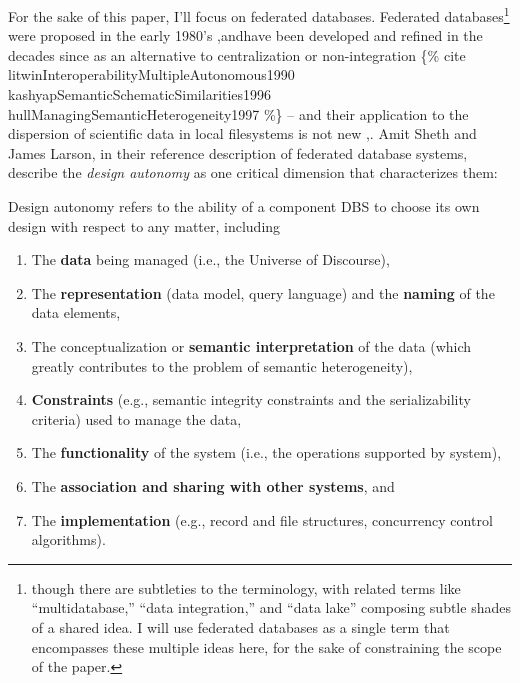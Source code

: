 \documentclass{article}
\begin{document}
For the sake of this paper, I'll focus on federated databases. Federated
databases\footnote{though there are subtleties to the terminology, with
  related terms like ``multidatabase,'' ``data integration,'' and ``data
  lake'' composing subtle shades of a shared idea. I will use federated
  databases as a single term that encompasses these multiple ideas here,
  for the sake of constraining the scope of the paper.} were proposed in
the early 1980's \cite{heimbignerFederatedArchitectureInformation1985},andhave been
developed and refined in the decades since as an alternative to
centralization or non-integration \{\% cite
litwinInteroperabilityMultipleAutonomous1990
kashyapSemanticSchematicSimilarities1996
hullManagingSemanticHeterogeneity1997 \%\} -- and their application to
the dispersion of scientific data in local filesystems is not new \cite{busseFederatedInformationSystems1999},.
Amit Sheth and James Larson, in their reference description of federated
database systems, describe the \emph{design autonomy} as one critical
dimension that characterizes them:

\begin{leftbar}
Design autonomy refers to the ability of a component DBS to choose its
own design with respect to any matter, including

\begin{enumerate}
\def\labelenumi{(\alph{enumi})}

\item
  The \textbf{data} being managed (i.e., the Universe of Discourse),
\item
  The \textbf{representation} (data model, query language) and the
  \textbf{naming} of the data elements,
\item
  The conceptualization or \textbf{semantic interpretation} of the data
  (which greatly contributes to the problem of semantic heterogeneity),
\item
  \textbf{Constraints} (e.g., semantic integrity constraints and the
  serializability criteria) used to manage the data,
\item
  The \textbf{functionality} of the system (i.e., the operations
  supported by system),
\item
  The \textbf{association and sharing with other systems}, and
\item
  The \textbf{implementation} (e.g., record and file structures,
  concurrency control algorithms).
\end{enumerate}
\end{leftbar}
\end{document}
